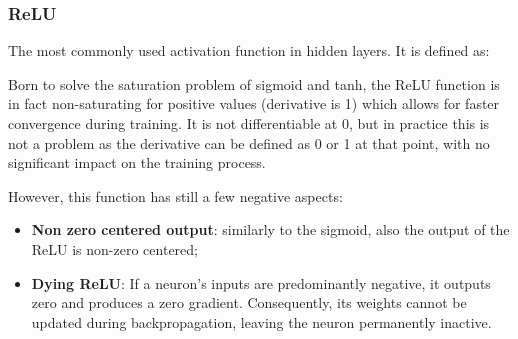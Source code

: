 \subsubsection{ReLU}
The most commonly used activation function in hidden layers. It is defined as:
\begin{figure}[H]
    \centering
    
\end{figure}

Born to solve the saturation problem of sigmoid and tanh, the ReLU function is in fact non-saturating for positive values (derivative is 1) which allows for faster convergence during training.
It is not differentiable at 0, but in practice this is not a problem as the derivative can be defined as 0 or 1 at that point, with no significant impact on the training process.

However, this function has still a few negative aspects:
\begin{itemize}
    \item \textbf{Non zero centered output}: similarly to the sigmoid, also the output of the ReLU is non-zero centered;
    
    \item \textbf{Dying ReLU}: If a neuron's inputs are predominantly negative, it outputs zero and produces a zero gradient. 
    Consequently, its weights cannot be updated during backpropagation, leaving the neuron permanently inactive.
\end{itemize}

